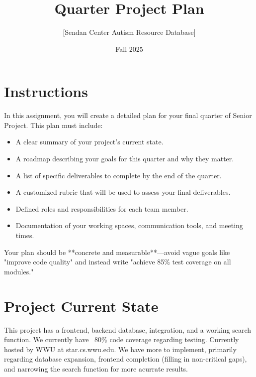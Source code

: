 \documentclass{article}
\title{Quarter Project Plan}
\author{[Sendan Center Autism Resource Database]}
\date{Fall 2025}
\begin{document}
\maketitle

\section*{Instructions}
In this assignment, you will create a detailed plan for your final quarter of Senior Project.  
This plan must include:  
\begin{itemize}
    \item A clear summary of your project’s current state.  
    \item A roadmap describing your goals for this quarter and why they matter.  
    \item A list of specific deliverables to complete by the end of the quarter.  
    \item A customized rubric that will be used to assess your final deliverables.  
    \item Defined roles and responsibilities for each team member.  
    \item Documentation of your working spaces, communication tools, and meeting times.  
\end{itemize}

Your plan should be **concrete and measurable**—avoid vague goals like "improve code quality" and instead write "achieve 85\% test coverage on all modules."  


\section*{Project Current State}
This project has a frontend, backend database, integration, and a working search function. We currently have ~80\% code coverage regarding testing. Currently hosted by WWU at star.cs.wwu.edu. We have more to implement, primarily regarding database expansion, frontend completion (filling in non-critical gaps), and narrowing the search function for more acurrate results.
\end{document}
